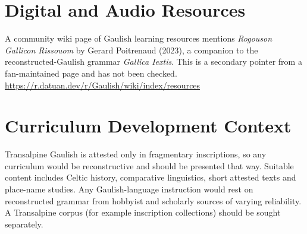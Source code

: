 \documentclass[12pt]{article}
\begin{document}
\section{Digital and Audio Resources}
A community wiki page of Gaulish learning resources mentions \textit{Rogouson Gallicon Rissouom} by Gerard Poitrenaud (2023), a companion to the reconstructed-Gaulish grammar \textit{Gall\^ica Iextis}. This is a secondary pointer from a fan-maintained page and has not been checked. \url{https://r.datuan.dev/r/Gaulish/wiki/index/resources}

\section{Curriculum Development Context}
Transalpine Gaulish is attested only in fragmentary inscriptions, so any curriculum would be reconstructive and should be presented that way. Suitable content includes Celtic history, comparative linguistics, short attested texts and place-name studies. Any Gaulish-language instruction would rest on reconstructed grammar from hobbyist and scholarly sources of varying reliability. A Transalpine corpus (for example inscription collections) should be sought separately.
\end{document}

